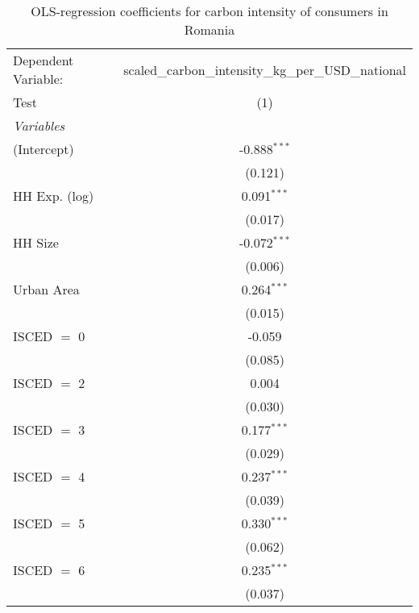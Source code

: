 
\begin{table}[htbp!]
   \centering
   \small
   \begin{adjustbox}{width = 1\textwidth, max height = 0.95\textheight, center}
      \begin{threeparttable}[b]
         \caption{\label{tab:OLS_1_ROU} OLS-regression coefficients for carbon intensity of consumers in Romania}
         \begin{tabular}{lc}
            \tabularnewline \midrule \midrule
            Dependent Variable: & scaled\_carbon\_intensity\_kg\_per\_USD\_national\\        
            Test                & (1)\\  
            \midrule
            \emph{Variables}\\
            (Intercept)         & -0.888$^{***}$\\   
                                & (0.121)\\   
            HH Exp. (log)       & 0.091$^{***}$\\   
                                & (0.017)\\   
            HH Size             & -0.072$^{***}$\\   
                                & (0.006)\\   
            Urban Area          & 0.264$^{***}$\\   
                                & (0.015)\\   
            ISCED $=$ 0         & -0.059\\   
                                & (0.085)\\   
            ISCED $=$ 2         & 0.004\\   
                                & (0.030)\\   
            ISCED $=$ 3         & 0.177$^{***}$\\   
                                & (0.029)\\   
            ISCED $=$ 4         & 0.237$^{***}$\\   
                                & (0.039)\\   
            ISCED $=$ 5         & 0.330$^{***}$\\   
                                & (0.062)\\   
            ISCED $=$ 6         & 0.235$^{***}$\\   
                                & (0.037)\\   

\end{tabular}
\end{threeparttable}
\end{adjustbox}
\end{table}
